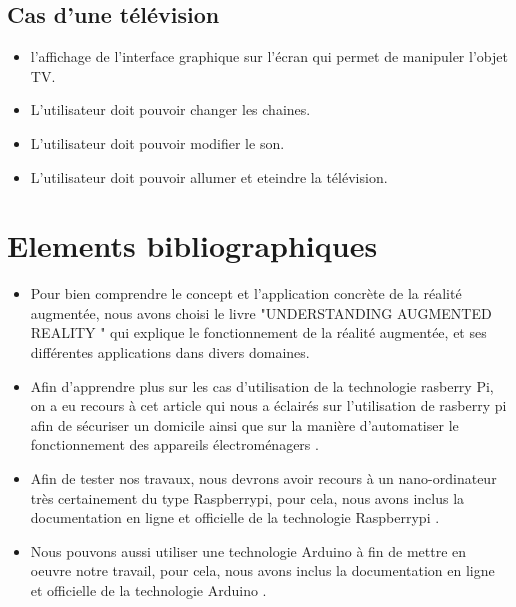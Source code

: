 \documentclass[12pt,a4paper]{article}
\begin{document}
\subsection{Cas d'une télévision}
\begin{itemize} 
  \item l’affichage de l’interface graphique sur l’écran qui permet de manipuler l’objet TV.
  \item L’utilisateur doit pouvoir changer les chaines.
  \item L’utilisateur doit pouvoir modifier le son.
  \item L’utilisateur doit pouvoir allumer et eteindre la télévision.
\end{itemize}

\newpage
\section{Elements bibliographiques}

\begin{itemize}
  \item Pour bien comprendre le concept et l'application concrète de la réalité augmentée, nous avons choisi le livre "UNDERSTANDING AUGMENTED REALITY "\cite{Ref1} qui explique le fonctionnement de la réalité augmentée, et ses différentes applications dans divers domaines.
  \item Afin d'apprendre plus sur les cas d'utilisation de la technologie rasberry Pi, on a eu recours à cet article qui nous a éclairés sur l'utilisation de rasberry pi afin de sécuriser un domicile ainsi que sur la manière d'automatiser le fonctionnement des appareils \'electrom\'enagers \cite{Ref2}.
  \item Afin de tester nos travaux, nous devrons avoir recours à un nano-ordinateur très certainement du type Raspberrypi, pour cela, nous avons inclus la documentation en ligne et officielle de la technologie Raspberrypi \cite{Ref3}.
  \item Nous pouvons aussi utiliser une technologie Arduino à fin de mettre en oeuvre notre travail, pour cela, nous avons inclus la documentation en ligne et officielle de la technologie Arduino \cite{Ref4}. 
\end{itemize}
\end{document}
